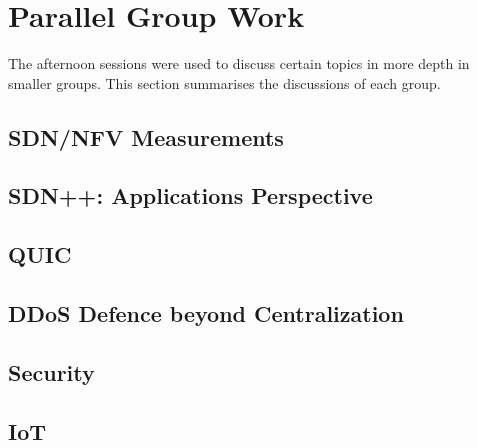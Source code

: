 \section{Parallel Group Work}\label{sec:parallel-group-work}

The afternoon sessions were used to discuss certain topics in more depth in
smaller groups. This section summarises the discussions of each group.

\subsection{SDN/NFV Measurements}

\subsection{SDN++: Applications Perspective}

\subsection{QUIC}



\subsection{DDoS Defence beyond Centralization}

\subsection{Security}

\subsection{IoT}